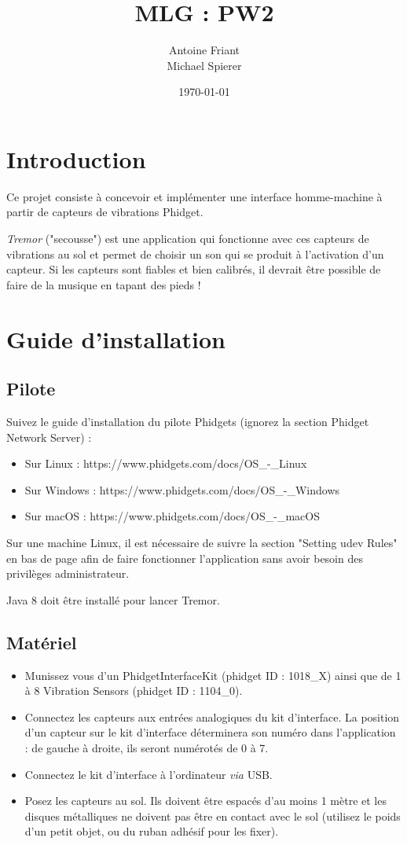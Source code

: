 \documentclass[11pt,a4paper,twoside,svgnames]{article}
\title{\color{DarkGreen}\huge\bfseries MLG : PW2}
\author{Antoine Friant\\Michael Spierer}
\date{\today}
\begin{document}
	
	\maketitle
	
	
	\section{Introduction}
	Ce projet consiste à concevoir et implémenter une interface homme-machine à partir de capteurs de vibrations Phidget.
	
	\textit{Tremor} ("secousse") est une application qui fonctionne avec ces capteurs de vibrations au sol et permet de choisir un son qui se produit à l'activation d'un capteur. Si les capteurs sont fiables et bien calibrés, il devrait être possible de faire de la musique en tapant des pieds !
	
	\section{Guide d'installation}
	
	\subsection{Pilote}
	Suivez le guide d'installation du pilote Phidgets (ignorez la section Phidget Network Server) :
	\begin{itemize}
		\item Sur Linux : https://www.phidgets.com/docs/OS\_-\_Linux
		\item Sur Windows : https://www.phidgets.com/docs/OS\_-\_Windows
		\item Sur macOS : https://www.phidgets.com/docs/OS\_-\_macOS
	\end{itemize}
	
	Sur une machine Linux, il est nécessaire de suivre la section "Setting udev Rules" en bas de page afin de faire fonctionner l'application sans avoir besoin des privilèges administrateur.
	
	Java 8 doit être installé pour lancer Tremor.
	
	\subsection{Matériel}
	\begin{itemize}
		\item Munissez vous d'un PhidgetInterfaceKit (phidget ID : 1018\_X) ainsi que de 1 à 8 Vibration Sensors (phidget ID : 1104\_0).
		\item Connectez les capteurs aux entrées analogiques du kit d'interface. La position d'un capteur sur le kit d'interface déterminera son numéro dans l'application : de gauche à droite, ils seront numérotés de 0 à 7.
		\item Connectez le kit d'interface à l'ordinateur \textit{via} USB.
		\item Posez les capteurs au sol. Ils doivent être espacés d'au moins 1 mètre et les disques métalliques ne doivent pas être en contact avec le sol (utilisez le poids d'un petit objet, ou du ruban adhésif pour les fixer).
	\end{itemize}
\end{document}
